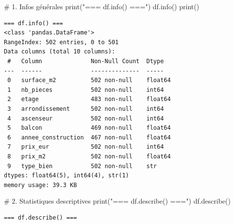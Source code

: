 \documentclass[
  french,
  11pt,
  a4paper,
]{scrbook}
\newenvironment{Shaded}{}{}
\newcommand{\BuiltInTok}[1]{\textcolor[rgb]{0.84,0.23,0.29}{#1}}
\newcommand{\CommentTok}[1]{\textcolor[rgb]{0.42,0.45,0.49}{#1}}
\newcommand{\NormalTok}[1]{\textcolor[rgb]{0.14,0.16,0.18}{#1}}
\newcommand{\StringTok}[1]{\textcolor[rgb]{0.01,0.18,0.38}{#1}}
\begin{document}
\begin{tcolorbox}[enhanced jigsaw, arc=.35mm, bottomrule=.15mm, bottomtitle=1mm, breakable, colback=white, colbacktitle=quarto-callout-tip-color!10!white, colframe=quarto-callout-tip-color-frame, coltitle=black, left=2mm, leftrule=.75mm, opacityback=0, opacitybacktitle=0.6, rightrule=.15mm, title=\textcolor{quarto-callout-tip-color}{\faLightbulb}\hspace{0.5em}{✅ Corrigé Étape 1.1}, titlerule=0mm, toprule=.15mm, toptitle=1mm]

\begin{Shaded}
\begin{Highlighting}[]
\CommentTok{\# 1. Infos générales}
\BuiltInTok{print}\NormalTok{(}\StringTok{"=== df.info() ==="}\NormalTok{)}
\NormalTok{df.info()}
\BuiltInTok{print}\NormalTok{()}
\end{Highlighting}
\end{Shaded}

\begin{verbatim}
=== df.info() ===
<class 'pandas.DataFrame'>
RangeIndex: 502 entries, 0 to 501
Data columns (total 10 columns):
 #   Column              Non-Null Count  Dtype  
---  ------              --------------  -----  
 0   surface_m2          502 non-null    float64
 1   nb_pieces           502 non-null    int64  
 2   etage               483 non-null    float64
 3   arrondissement      502 non-null    int64  
 4   ascenseur           502 non-null    int64  
 5   balcon              469 non-null    float64
 6   annee_construction  467 non-null    float64
 7   prix_eur            502 non-null    int64  
 8   prix_m2             502 non-null    float64
 9   type_bien           502 non-null    str    
dtypes: float64(5), int64(4), str(1)
memory usage: 39.3 KB
\end{verbatim}

\begin{Shaded}
\begin{Highlighting}[]
\CommentTok{\# 2. Statistiques descriptives}
\BuiltInTok{print}\NormalTok{(}\StringTok{"=== df.describe() ==="}\NormalTok{)}
\NormalTok{df.describe()}
\end{Highlighting}
\end{Shaded}

\begin{verbatim}
=== df.describe() ===
\end{verbatim}


\end{tcolorbox}
\end{document}
